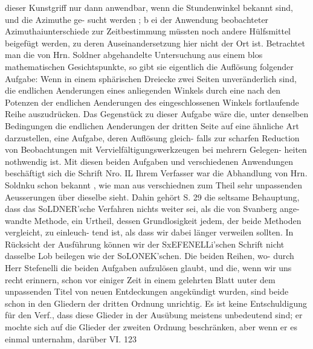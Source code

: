 \documentclass[12pt,a4paper]{article}
\begin{document}
dieser Kunstgriff nur dann anwendbar, wenn die Stundenwinkel bekannt sind, und die Azimuthe ge-\newline
sucht werden ; b ei der Anwendung beobachteter Azimuthaiunterschiede zur Zeitbestimmung müssten noch\newline
andere Hülfsmittel beigefügt werden, zu deren Auseinandersetzung hier nicht der Ort ist.\newline
Betrachtet man die von Hrn. Soldner abgehandelte Untersuchung aus einem blos mathematischen\newline
Gesichtspunkte, so gibt sie eigentlich die Auflösung folgender Aufgabe: Wenn in einem sphärischen\newline
Dreiecke zwei Seiten unveränderlich sind, die endlichen Aenderungen eines anliegenden Winkels durch\newline
eine nach den Potenzen der endlichen Aenderungen des eingeschlossenen Winkels fortlaufende Reihe\newline
auszudrücken. Das Gegenstück zu dieser Aufgabe wäre die, unter denselben Bedingungen die endlichen\newline
Aenderungen der dritten Seite auf eine ähnliche Art darzustellen, eine Aufgabe, deren Auflösung gleich-\newline
falls zur scharfen Reduction von Beobachtungen mit Vervielfältigungswerkzeugen bei mehrern Gelegen-\newline
heiten nothwendig ist. Mit diesen beiden Aufgaben und verschiedenen Anwendungen beschäftigt sich\newline
die Schrift Nro. IL Ihrem Verfasser war die Abhandlung von Hrn. Soldnku schon bekannt , wie man\newline
aus verschiednen zum Theil sehr unpassenden Aeusserungen über dieselbe sieht. Dahin gehört S. 29 die\newline
seltsame Behauptung, dass das SoLDNER'sche Verfahren nichts weiter sei, als die von Svanberg ange-\newline
wandte Methode, ein Urtheil, dessen Grundlosigkeit jedem, der beide Methoden vergleicht, zu einleuch-\newline
tend ist, als dass wir dabei länger verweilen sollten. In Rücksicht der Ausführung können wir der\newline
SxEFENELLi'schen Schrift nicht dasselbe Lob beilegen wie der SoLONEK'schen. Die beiden Reihen, wo-\newline
durch Herr Stefenelli die beiden Aufgaben aufzulösen glaubt, und die, wenn wir uns recht erinnern,\newline
schon vor einiger Zeit in einem gelehrten Blatt uuter dem unpassenden Titel von neuen Entdeckungen\newline
angekündigt wurden, sind beide schon in den Gliedern der dritten Ordnung unrichtig. Es ist keine\newline
Entschuldigung für den Verf., dass diese Glieder in der Ausübung meistens unbedeutend sind; er mochte\newline
sich auf die Glieder der zweiten Ordnung beschränken, aber wenn er es einmal unternahm, darüber\newline
VI. 123\newline
\end{document}
